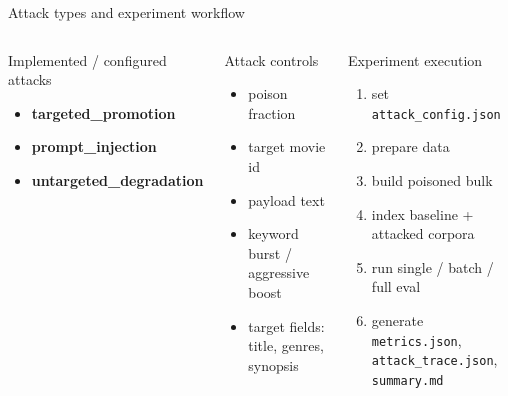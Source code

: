 \documentclass[aspectratio=169,11pt]{beamer}
\begin{document}
\begin{frame}{Attack types and experiment workflow}
\begin{columns}[T,totalwidth=\textwidth]
\begin{block}{Implemented / configured attacks}
\begin{itemize}
  \item \textbf{targeted\_promotion}
  \item \textbf{prompt\_injection}
  \item \textbf{untargeted\_degradation}
\end{itemize}
\end{block}
\begin{block}{Attack controls}
\begin{itemize}
  \item poison fraction
  \item target movie id
  \item payload text
  \item keyword burst / aggressive boost
  \item target fields: title, genres, synopsis
\end{itemize}
\end{block}

\begin{block}{Experiment execution}
\begin{enumerate}
  \item set \texttt{attack\_config.json}
  \item prepare data
  \item build poisoned bulk
  \item index baseline + attacked corpora
  \item run single / batch / full eval
  \item generate \texttt{metrics.json}, \texttt{attack\_trace.json}, \texttt{summary.md}
\end{enumerate}
\end{block}
\end{columns}
\end{frame}
\end{document}
